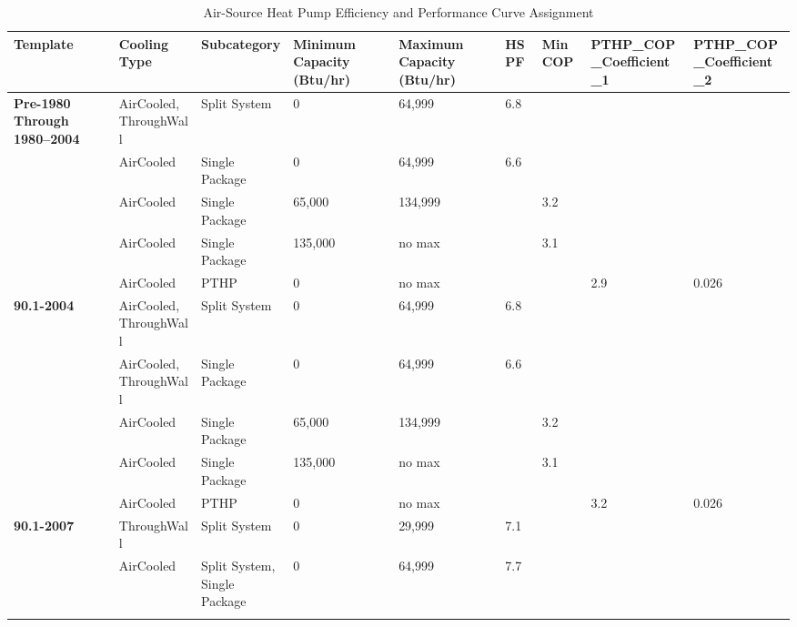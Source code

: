 \begin{table}[h!]
\scriptsize
\centering
\caption{Air-Source Heat Pump Efficiency and Performance Curve Assignment}
\label{tab:ashp_eff}
\begin{tabular}{|p{0.4in}|p{0.5in}|p{0.75in}|p{0.4in}|p{0.4in}|p{0.4in}|p{0.4in}|p{0.4in}|p{0.4in}|}
\hline
\textbf{Template} &
  \textbf{Cooling Type} &
  \textbf{Subcategory} &
  \textbf{Minimum Capacity (Btu/hr)} &
  \textbf{Maximum Capacity (Btu/hr)} &
  \textbf{HSPF} &
  \textbf{Min COP} &
  \textbf{PTHP\_COP\_Coefficient\_1} &
  \textbf{PTHP\_COP\_Coefficient\_2} \\ \hline
\multirow{5}{*}{\parbox{0.4in}{\textbf{Pre-1980 Through 1980--2004}}} 
& AirCooled, ThroughWall    & Split System                  &  0      & 64,999    & 6.8 & & & \\ \cline{2-9}
& AirCooled                 & Single Package                & 0       & 64,999    & 6.6 & & & \\ \cline{2-9} 
& AirCooled                 & Single Package                & 65,000  & 134,999   &     & 3.2 & & \\ \cline{2-9} 
& AirCooled                 & Single Package                & 135,000 & no max    &     & 3.1 &     & \\ \cline{2-9} 
& AirCooled                 & PTHP                          & 0       & no max    &     &     & 2.9 & 0.026 \\ \hline
\multirow{5}{*}{\textbf{90.1-2004}}
& AirCooled, ThroughWall    & Split System                  & 0       & 64,999    & 6.8 &     &     & \\ \cline{2-9} 
& AirCooled, ThroughWall    & Single Package                & 0       & 64,999    & 6.6 &     &     & \\ \cline{2-9} 
& AirCooled                 & Single Package                & 65,000  & 134,999   &     & 3.2 &     & \\ \cline{2-9} 
& AirCooled                 & Single Package                & 135,000 & no max    &     & 3.1 &     & \\ \cline{2-9} 
& AirCooled                 & PTHP                          & 0       & no max    &     &     & 3.2 & 0.026 \\ \hline
\multirow{6}{*}{\textbf{90.1-2007}}
& ThroughWall               & Split System                  & 0       & 29,999    & 7.1 & & & \\ \cline{2-9} 
& AirCooled                 & Split System, Single Package  & 0       & 64,999    & 7.7 &     &     & \\ \cline{2-9} 

\end{tabular}
\end{table}
